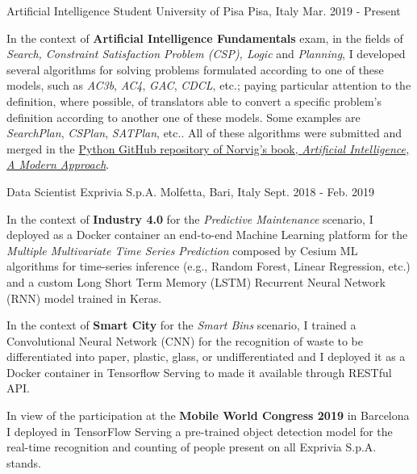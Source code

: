 

\begin{cventries}

  \cventry
    {Artificial Intelligence Student} %
    {University of Pisa} %
    {Pisa, Italy} %
    {Mar. 2019 - Present} %
    {   
      \begin{cvitems} %
        \item {In the context of \textbf{Artificial Intelligence Fundamentals} exam, in the fields of \textit{Search, Constraint Satisfaction Problem (CSP), Logic} and \textit{Planning}, I developed several algorithms for solving problems formulated according to one of these models, such as \textit{AC3b}, \textit{AC4}, \textit{GAC}, \textit{CDCL}, etc.; paying particular attention to the definition, where possible, of translators able to convert a specific problem's definition according to another one of these models. Some examples are \textit{SearchPlan}, \textit{CSPlan}, \textit{SATPlan}, etc.. All of these algorithms were submitted and merged in the \href{https://github.com/aimacode/aima-python}{Python GitHub repository of Norvig's book, \textit{Artificial Intelligence, A Modern Approach}}.}
      \end{cvitems}
    }

  \cventry
    {Data Scientist} %
    {Exprivia S.p.A.} %
    {Molfetta, Bari, Italy} %
    {Sept. 2018 - Feb. 2019} %
    {   
      \begin{cvitems} %
        \item {In the context of \textbf{Industry 4.0} for the \textit{Predictive Maintenance} scenario, I deployed as a Docker container an end-to-end Machine Learning platform for the \textit{Multiple Multivariate Time Series Prediction} composed by Cesium ML algorithms for time-series inference (e.g., Random Forest, Linear Regression, etc.) and a custom Long Short Term Memory (LSTM) Recurrent Neural Network (RNN) model trained in Keras.}
        \item {In the context of \textbf{Smart City} for the \textit{Smart Bins} scenario, I trained a Convolutional Neural Network (CNN) for the recognition of waste to be differentiated into paper, plastic, glass, or undifferentiated and I deployed it as a Docker container in Tensorflow Serving to made it available through RESTful API.}
        \item {In view of the participation at the \textbf{Mobile World Congress 2019} in Barcelona I deployed in TensorFlow Serving a pre-trained object detection model for the real-time recognition and counting of people present on all Exprivia S.p.A. stands.}
      \end{cvitems}
    }

\end{cventries}
